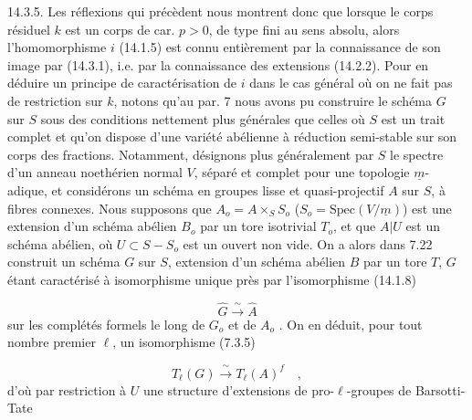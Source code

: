 14.3.5. Les réflexions qui précèdent nous montrent donc que lorsque le corps résiduel $k$ est un corps de car. $p > 0$, de type fini au sens absolu, alors l'homomorphisme $i$ (14.1.5) est connu entièrement par la connaissance de son image par (14.3.1), i.e. par la connaissance des extensions (14.2.2). Pour en déduire un principe de caractérisation de $i$ dans le cas général où on ne fait pas de restriction sur $k$, notons qu'au par. 7 nous avons pu construire le schéma $G$ sur $S$ sous des conditions nettement plus générales que celles où $S$ est un trait complet et qu'on dispose d'une variété abélienne à réduction semi-stable sur son corps des fractions. Notamment, désignons plus généralement par $S$ le spectre d'un anneau noethérien normal $V$, séparé et complet pour une topologie $\underline{m}$-adique, et considérons un schéma en groupes lisse et quasi-projectif $A$ sur $S$, à fibres connexes. Nous supposons que $A_o = A \times_S S_o$ ($S_o = \mathrm{Spec}(V/\underline{m})$) est une extension d'un schéma abélien $B_o$ par un tore isotrivial $T_o$, et que $A|U$ est un schéma abélien, où $U \subset S - S_o$ est un ouvert non vide. On a alors dans 7.22 construit un schéma $G$ sur $S$, extension d'un schéma abélien $B$ par un tore $T$, $G$ étant caractérisé à isomorphisme unique près par l'isomorphisme (14.1.8)

\begin{equation}\tag{14.3.5.1}
\hat{G} \xrightarrow{\ \sim\ } \hat{A}
\end{equation}
sur les complétés formels le long de $G_o$ et de $A_o$ . On en déduit, pour tout nombre premier $\ell$, un isomorphisme (7.3.5)



\begin{equation}\tag{14.3.5.2}
T_\ell(G) \xrightarrow{\ \sim\ } T_\ell(A)^f \quad ,
\end{equation}
d'où par restriction à $U$ une structure d'extensions de pro-$\ell$-groupes de Barsotti-Tate

